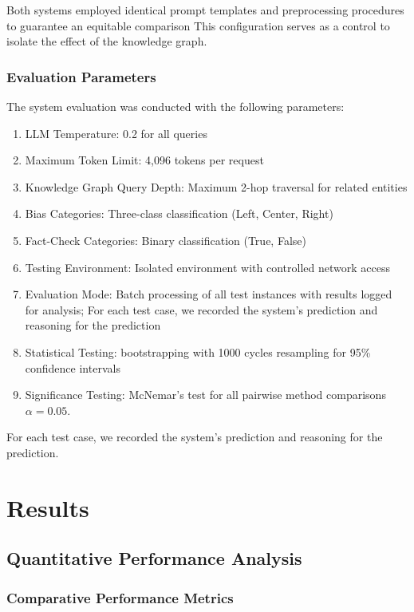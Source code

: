 \documentclass[11pt]{article}
\begin{document}
Both systems employed identical prompt templates and preprocessing procedures to guarantee an equitable comparison This configuration serves as a control to isolate the effect of the knowledge graph.

\subsubsection{Evaluation Parameters}
The system evaluation was conducted with the following parameters:
\begin{enumerate}
    \item LLM Temperature: 0.2 for all queries 
    \item Maximum Token Limit: 4,096 tokens per request
    \item Knowledge Graph Query Depth: Maximum 2-hop traversal for related entities
    \item Bias Categories: Three-class classification (Left, Center, Right)
    \item Fact-Check Categories: Binary classification (True, False) 
    \item Testing Environment: Isolated environment with controlled network access
    \item Evaluation Mode: Batch processing of all test instances with results logged for analysis; For each test case, we recorded the system’s prediction and reasoning for the prediction
    \item  Statistical Testing: bootstrapping with 1000 cycles resampling for 95\% confidence intervals
    \item  Significance Testing: McNemar's test for all pairwise method comparisons $\alpha=0.05$.



\end{enumerate}
For each test case, we recorded the system’s prediction and reasoning for the prediction. 

\section{Results}
\subsection{Quantitative Performance Analysis}
\subsubsection{Comparative Performance Metrics}
\end{document}
